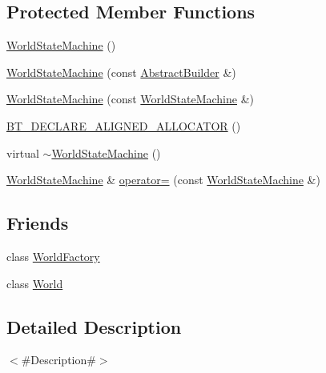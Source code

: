 \subsection*{Protected Member Functions}
\begin{DoxyCompactItemize}
\item 
\mbox{\hyperlink{classnjli_1_1_world_state_machine_a80041da9020fb96c011424d51348f32e}{World\+State\+Machine}} ()
\item 
\mbox{\hyperlink{classnjli_1_1_world_state_machine_a9b37c82c6bd19265ec08cfacdc6d91b2}{World\+State\+Machine}} (const \mbox{\hyperlink{classnjli_1_1_abstract_builder}{Abstract\+Builder}} \&)
\item 
\mbox{\hyperlink{classnjli_1_1_world_state_machine_af9a9e52e10ffa0e657cd2a3a7f5f6660}{World\+State\+Machine}} (const \mbox{\hyperlink{classnjli_1_1_world_state_machine}{World\+State\+Machine}} \&)
\item 
\mbox{\hyperlink{classnjli_1_1_world_state_machine_ab6b55bb83f3296f134b5855287782d27}{B\+T\+\_\+\+D\+E\+C\+L\+A\+R\+E\+\_\+\+A\+L\+I\+G\+N\+E\+D\+\_\+\+A\+L\+L\+O\+C\+A\+T\+OR}} ()
\item 
virtual \mbox{\hyperlink{classnjli_1_1_world_state_machine_aa943f77c31d49ba58aa92499086502d6}{$\sim$\+World\+State\+Machine}} ()
\item 
\mbox{\hyperlink{classnjli_1_1_world_state_machine}{World\+State\+Machine}} \& \mbox{\hyperlink{classnjli_1_1_world_state_machine_a53e7a9082c4e0beff0f9c9e62f3b666f}{operator=}} (const \mbox{\hyperlink{classnjli_1_1_world_state_machine}{World\+State\+Machine}} \&)
\end{DoxyCompactItemize}
\subsection*{Friends}
\begin{DoxyCompactItemize}
\item 
class \mbox{\hyperlink{classnjli_1_1_world_state_machine_acb96ebb09abe8f2a37a915a842babfac}{World\+Factory}}
\item 
class \mbox{\hyperlink{classnjli_1_1_world_state_machine_a7b4bcdf992c21ae83363f25df05b1d25}{World}}
\end{DoxyCompactItemize}


\subsection{Detailed Description}
$<$\#\+Description\#$>$ 

